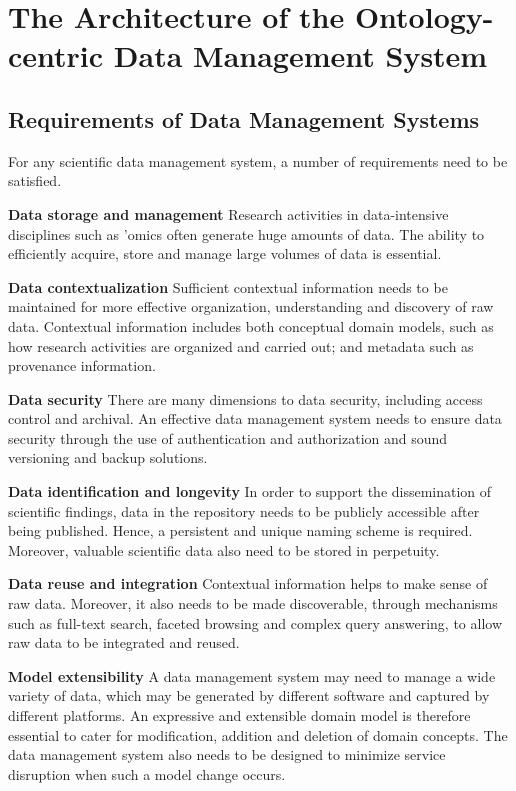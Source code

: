 \documentclass[preprint,12pt]{elsarticle}
\begin{document}
\section{The Architecture of the Ontology-centric Data Management System}\label{sec:arch}

\subsection{Requirements of Data Management Systems}

For any scientific data management system, a number of requirements need to be satisfied.

\begin{list}{}{\leftmargin=30pt}
\item[\textbf{Data storage and management}] Research activities in data-intensive disciplines such as 'omics often generate huge amounts of data. The ability to efficiently acquire, store and manage large volumes of data is essential.

\item[\textbf{Data contextualization}] Sufficient contextual information needs to be maintained for more effective organization, understanding and discovery of raw data. Contextual information includes both conceptual domain models, such as how research activities are organized and carried out; and metadata such as provenance information.

\item[\textbf{Data security}] There are many dimensions to data security, including access control and archival. An effective data management system needs to ensure data security through the use of authentication and authorization and sound versioning and backup solutions. 

\item[\textbf{Data identification and longevity}] In order to support the dissemination of scientific findings, data in the repository needs to be publicly accessible after being published. Hence, a persistent and unique naming scheme is required. Moreover, valuable scientific data also need to be stored in perpetuity.

\item[\textbf{Data reuse and integration}] Contextual information helps to make sense of raw data. Moreover, it also needs to be made discoverable, through mechanisms such as full-text search, faceted browsing and complex query answering, to allow raw data to be integrated and reused.

\item[\textbf{Model extensibility}] A data management system may need to manage a wide variety of data, which may be generated by different software and captured by different platforms. An expressive and extensible domain model is therefore essential to cater for modification, addition and deletion of domain concepts. The data management system also needs to be designed to minimize service disruption when such a model change occurs.
\end{list}
\end{document}

